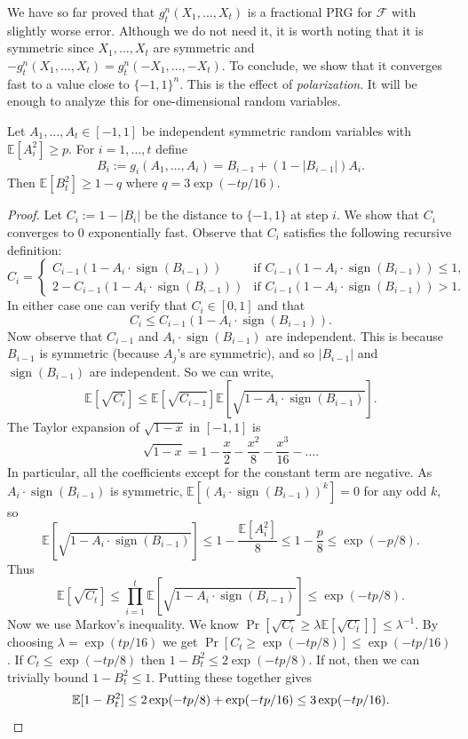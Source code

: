 \documentclass{toc}
\newcommand{\E}{\mathbb{E}}
\newcommand{\FF}{\mathcal{F}}
\DeclareMathOperator{\sign}{sign}     %
\begin{document}
We have so far proved that $g_t^n(X_1,\ldots,X_t)$ is a fractional PRG for $\FF$ with slightly worse error. Although we do not need it, it is worth
noting that it is symmetric since $X_1,\ldots,X_t$ are symmetric
and $-g_t^n(X_1,\ldots,X_t)=g_t^n(-X_1,\ldots,-X_t)$.
To conclude, we show that it
converges fast to a value close to $\{-1,1\}^n$. This is the effect of \emph{polarization}. It will be enough to analyze this
for one-dimensional random variables.

\begin{claim}
\label{claim:polar_onedim}
Let $A_1,\ldots,A_t \in [-1,1]$ be independent symmetric random variables with $\E[A_i^2] \ge p$.
For $i=1,\ldots,t$ define
$$
B_i:=g_i(A_1,\ldots,A_i) = B_{i-1} + (1-|B_{i-1}|) A_i.
$$
Then $\E[B_t^2] \ge 1-q$ where $q=3 \exp(-tp/16)$.
\end{claim}

\begin{proof}
 Let $C_i := 1-|B_i|$ be the distance to $\{-1,1\}$ at step $i$. We show that $C_i$ converges to $0$ exponentially fast. Observe that $C_i$ satisfies the following recursive definition:
$$
C_i =
\begin{cases}
C_{i-1} (1-A_i\cdot \sign(B_{i-1})) & \text{if } C_{i-1} (1-A_i\cdot\sign(B_{i-1})) \le 1, \\
2 - C_{i-1} (1-A_i\cdot \sign(B_{i-1})) & \text{if } C_{i-1} (1-A_i\cdot \sign(B_{i-1})) > 1.
\end{cases}
$$
In either case one can verify that $C_i \in [0,1]$ and that
$$
	C_i \le C_{i-1} (1-A_i\cdot\sign(B_{i-1})).
$$
	Now observe that $C_{i-1}$ and $A_i\cdot\sign(B_{i-1})$ are independent. This is because $B_{i-1}$ is symmetric (because $A_j$'s are symmetric), and so $|B_{i-1}|$ and $\sign(B_{i-1})$ are independent. So we can write, 
$$
\E\left[\sqrt{C_i}\right] \leq \E\left[\sqrt{C_{i-1}}\right] \E\left[\sqrt{1-A_i\cdot\sign(B_{i-1})}\right].
$$
The Taylor expansion of $\sqrt{1-x}$ in $[-1,1]$ is
$$
\sqrt{1-x} = 1 - \frac{x}{2} - \frac{x^2}{8}  - \frac{x^3}{16} - \ldots.
$$
	In particular, all the coefficients except for the constant term are negative. As $A_i\cdot\sign(B_{i-1})$ is symmetric, $\E[(A_i\cdot\sign(B_{i-1}))^k]=0$ for any odd $k$, so
$$
\E\left[\sqrt{1-A_i\cdot\sign(B_{i-1})}\right] \le 1 - \frac{\E[A_i^2]}{8} \le 1-\frac{p}{8} \le \exp(-p/8).
$$
Thus
$$
\E\left[\sqrt{C_t}\right] \le \prod_{i=1}^t \E\left[\sqrt{1-A_i\cdot\sign(B_{i-1})}\right] \le \exp(-t p / 8).
$$
	Now we use Markov's inequality. We know $\Pr[\sqrt{C_t}\geq \lambda \E\left[\sqrt{C_t}\right] ] \leq \lambda^{-1}$. By choosing $\lambda = \exp(t p / 16)$ we get $\Pr[C_t \geq \exp(-t p / 8) ] \leq \exp(-t p / 16)$.
 If $C_t \le \exp(-tp/8)$ then $1-B_t^2 \le 2 \exp(-tp/8)$.
If not, then we can trivially bound $1-B_t^2 \le 1$. Putting these together gives
\[
\E[1-B_t^2] \le 2 \exp(-tp/8) + \exp(-tp/16) \le 3 \exp(-tp/16).\qedhere
\]
\end{proof}
\end{document}
